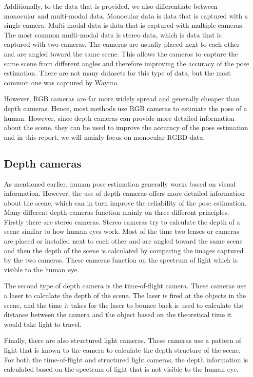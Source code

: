 Additionally, to the data that is provided, we also differentiate between monocular and multi-modal data. Monocular data is data that is captured with a single camera. Multi-modal data is data that is captured with multiple cameras. The most common multi-modal data is stereo data, which is data that is captured with two cameras. The cameras are usually placed next to each other and are angled toward the same scene. This allows the cameras to capture the same scene from different angles and therefore improving the accuracy of the pose estimation. There are not many datasets for this type of data, but the most common one was captured by Waymo\cite{Waymo}.

However, RGB cameras are far more widely spread and generally cheaper than depth cameras. Hence, most methods use RGB cameras to estimate the pose of a human. However, since depth cameras can provide more detailed information about the scene, they can be used to improve the accuracy of the pose estimation and in this report, we will mainly focus on monocular RGBD data.

\subsection{Depth cameras}

As mentioned earlier, human pose estimation generally works based on visual information. However, the use of depth cameras offers more detailed information about the scene, which can in turn improve the reliability of the pose estimation. Many different depth cameras function mainly on three different principles. Firstly there are stereo cameras. Stereo cameras try to calculate the depth of a scene similar to how human eyes work. Most of the time two lenses or cameras are placed or installed next to each other and are angled toward the same scene and then the depth of the scene is calculated by comparing the images captured by the two cameras. These cameras function on the spectrum of light which is visible to the human eye. 

The second type of depth camera is the time-of-flight camera. These cameras use a laser to calculate the depth of the scene. The laser is fired at the objects in the scene, and the time it takes for the laser to bounce back is used to calculate the distance between the camera and the object based on the theoretical time it would take light to travel. 

Finally, there are also structured light cameras. These cameras use a pattern of light that is known to the camera to calculate the depth structure of the scene. For both the time-of-flight and structured light cameras, the depth information is calculated based on the spectrum of light that is not visible to the human eye.

